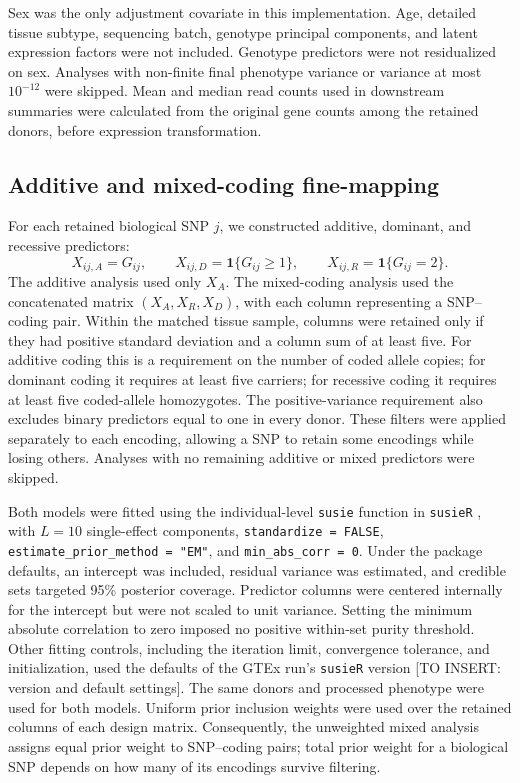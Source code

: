 \documentclass[12pt]{article}
\begin{document}
Sex was the only adjustment covariate in this implementation. Age, detailed
tissue subtype, sequencing batch, genotype principal components, and latent
expression factors were not included. Genotype predictors were not
residualized on sex. Analyses with non-finite final phenotype variance or
variance at most $10^{-12}$ were skipped. Mean and median read counts used
in downstream summaries were calculated from the original gene counts
among the retained donors, before expression transformation.

\subsection{Additive and mixed-coding fine-mapping}
For each retained biological SNP $j$, we constructed additive, dominant,
and recessive predictors:
\begin{equation}
 X_{ij,A}=G_{ij},\qquad
 X_{ij,D}=\mathbf{1}\{G_{ij}\geq 1\},\qquad
 X_{ij,R}=\mathbf{1}\{G_{ij}=2\}.
\end{equation}
The additive analysis used only $X_A$. The mixed-coding analysis used the
concatenated matrix $(X_A,X_R,X_D)$, with each column representing a
SNP--coding pair. Within the matched tissue sample, columns were retained
only if they had positive standard deviation and a column sum of at least
five. For additive coding this is a requirement on the number of coded
allele copies; for dominant coding it requires at least five carriers;
for recessive coding it requires at least five coded-allele homozygotes.
The positive-variance requirement also excludes binary predictors equal
to one in every donor. These filters were applied separately to each
encoding, allowing a SNP to retain some encodings while losing others.
Analyses with no remaining additive or mixed predictors were skipped.

Both models were fitted using the individual-level \texttt{susie} function
in \texttt{susieR} \cite{wang_simple_2020}, with $L=10$ single-effect
components, \texttt{standardize = FALSE},
\texttt{estimate\_prior\_method = "EM"}, and
\texttt{min\_abs\_corr = 0}. Under the package defaults, an intercept was
included, residual variance was estimated, and credible sets targeted
95\% posterior coverage. Predictor columns were centered internally for
the intercept but were not scaled to unit variance. Setting the minimum
absolute correlation to zero imposed no positive within-set purity
threshold. Other fitting controls, including the iteration limit,
convergence tolerance, and initialization, used the defaults of the GTEx
run's \texttt{susieR} version [TO INSERT: version and default settings].
The same donors and processed phenotype were used for both models.
Uniform prior inclusion weights were used over the retained columns of
each design matrix. Consequently, the unweighted mixed analysis assigns
equal prior weight to SNP--coding pairs; total prior weight for a
biological SNP depends on how many of its encodings survive filtering.
\end{document}

